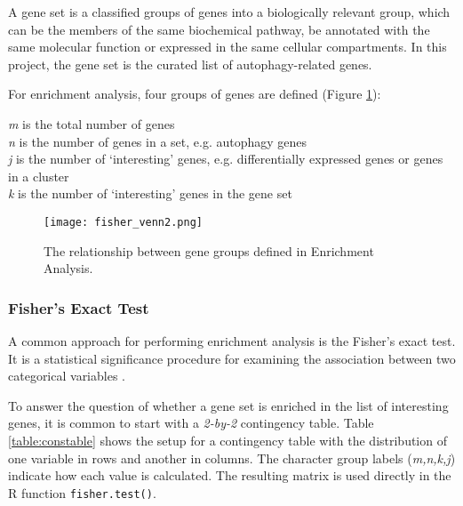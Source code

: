         A gene set is a classified groups of genes into a biologically relevant group, which can be the members of the same biochemical pathway, be annotated with the same molecular function or expressed in the same cellular compartments. In this project, the gene set is the curated list of autophagy-related genes. 
        
        For enrichment analysis, four groups of genes are defined (Figure \ref{fig:fishervenn}):
        
         \begin{itemize}
         \textit{m} is the total number of genes\\
         \textit{n} is the number of genes in a set, e.g. autophagy genes\\
         \textit{j}  is the number of ‘interesting’ genes, e.g. differentially expressed genes or genes in a cluster\\
         \textit{k} is the number of ‘interesting’ genes in the gene set\\
         \end{itemize}
        
                \begin{figure}[!h]
                \centering
                \small
               \texttt{[image: fisher\_venn2.png]}
                \caption[Enrichment analysis test setup diagram]{The relationship between gene groups defined in Enrichment Analysis.}
                \label{fig:fishervenn}
                \end{figure}
                
        \subsubsection{Fisher's Exact Test}
        
        A common approach for performing enrichment analysis is the Fisher’s exact test. It is a statistical significance procedure for examining the association between two categorical variables \cite{Fishersexacttest}. 
        
        To answer the question of whether a gene set is enriched in the list of interesting genes, it is common to start with a \textit{2-by-2} contingency table. Table \ref{table:constable} shows the setup for a contingency table with the distribution of one variable in rows and another in columns. The character group labels (\textit{m,n,k,j}) indicate how each value is calculated. The resulting matrix is used directly in the R function \texttt{fisher.test()}. 
        
